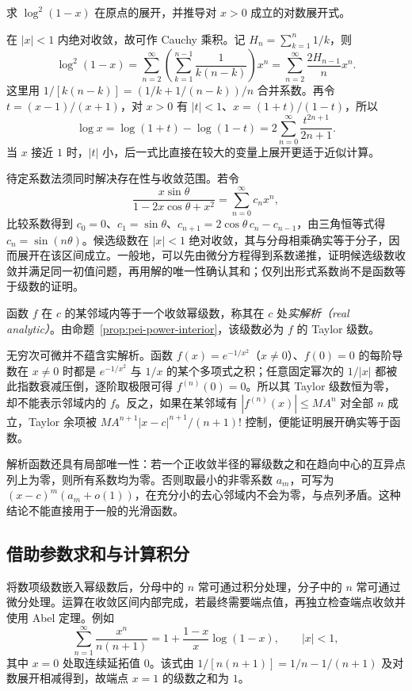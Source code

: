\begin{example}
求 $\log^2(1-x)$ 在原点的展开，并推导对 $x>0$ 成立的对数展开式。
\end{example}
\begin{solve}
在 $|x|<1$ 内绝对收敛，故可作 Cauchy 乘积。记 $H_n=\sum_{k=1}^{n}1/k$，则
\[
 \log^2(1-x)
 =\sum_{n=2}^{\infty}\left(\sum_{k=1}^{n-1}\frac1{k(n-k)}\right)x^n
 =\sum_{n=2}^{\infty}\frac{2H_{n-1}}n x^n.
\]
这里用 $1/[k(n-k)]=(1/k+1/(n-k))/n$ 合并系数。再令 $t=(x-1)/(x+1)$，对 $x>0$ 有 $|t|<1$、$x=(1+t)/(1-t)$，所以
\[
 \log x=\log(1+t)-\log(1-t)
 =2\sum_{n=0}^{\infty}\frac{t^{2n+1}}{2n+1}.
\]
当 $x$ 接近 $1$ 时，$|t|$ 小，后一式比直接在较大的变量上展开更适于近似计算。
\end{solve}

待定系数法须同时解决存在性与收敛范围。若令
\[
 \frac{x\sin\theta}{1-2x\cos\theta+x^2}=\sum_{n=0}^{\infty}c_nx^n,
\]
比较系数得到 $c_0=0$、$c_1=\sin\theta$、$c_{n+1}=2\cos\theta\,c_n-c_{n-1}$，由三角恒等式得 $c_n=\sin(n\theta)$。候选级数在 $|x|<1$ 绝对收敛，其与分母相乘确实等于分子，因而展开在该区间成立。一般地，可以先由微分方程得到系数递推，证明候选级数收敛并满足同一初值问题，再用解的唯一性确认其和；仅列出形式系数尚不是函数等于级数的证明。

\begin{definition}
函数 $f$ 在 $c$ 的某邻域内等于一个收敛幂级数，称其在 $c$ 处\emph{实解析（real analytic）}。由命题~\ref{prop:pei-power-interior}，该级数必为 $f$ 的 Taylor 级数。
\end{definition}

无穷次可微并不蕴含实解析。函数 $f(x)=e^{-1/x^2}$（$x\ne0$）、$f(0)=0$ 的每阶导数在 $x\ne0$ 时都是 $e^{-1/x^2}$ 与 $1/x$ 的某个多项式之积；任意固定幂次的 $1/|x|$ 都被此指数衰减压倒，逐阶取极限可得 $f^{(n)}(0)=0$。所以其 Taylor 级数恒为零，却不能表示邻域内的 $f$。反之，如果在某邻域有 $|f^{(n)}(x)|\leq MA^n$ 对全部 $n$ 成立，Taylor 余项被 $MA^{n+1}|x-c|^{n+1}/(n+1)!$ 控制，便能证明展开确实等于函数。

解析函数还具有局部唯一性：若一个正收敛半径的幂级数之和在趋向中心的互异点列上为零，则所有系数均为零。否则取最小的非零系数 $a_m$，可写为 $(x-c)^m(a_m+o(1))$，在充分小的去心邻域内不会为零，与点列矛盾。这种结论不能直接用于一般的光滑函数。

\subsection{借助参数求和与计算积分}

将数项级数嵌入幂级数后，分母中的 $n$ 常可通过积分处理，分子中的 $n$ 常可通过微分处理。运算在收敛区间内部完成，若最终需要端点值，再独立检查端点收敛并使用 Abel 定理。例如
\[
 \sum_{n=1}^{\infty}\frac{x^n}{n(n+1)}
 =1+\frac{1-x}{x}\log(1-x),\qquad |x|<1,
\]
其中 $x=0$ 处取连续延拓值 $0$。该式由 $1/[n(n+1)]=1/n-1/(n+1)$ 及对数展开相减得到，故端点 $x=1$ 的级数之和为 $1$。

